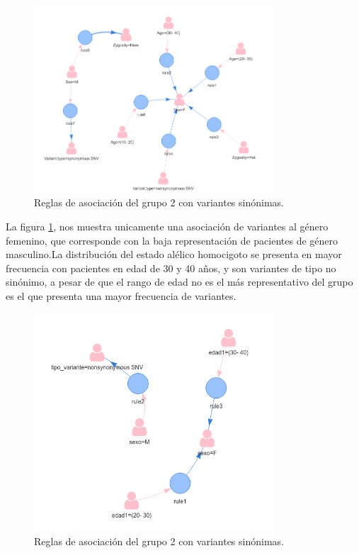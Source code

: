 \begin{figure}[H]
	\centering
	\includegraphics[width=0.8\textwidth]{Kap4/reglas2_1}
	\caption{Reglas de asociación del grupo 2 con variantes sinónimas.} \label{fig:reglas2_1}
\end{figure}

La figura \ref{fig:reglas2_1}, nos muestra unicamente una asociación de variantes al género femenino, que corresponde con la baja representación de pacientes de género  masculino.La distribución del estado alélico homocigoto se presenta en mayor frecuencia con pacientes en edad de 30 y 40 años, y son variantes de tipo no sinónimo, a pesar de que el rango de edad no es el más representativo del grupo es el que presenta una mayor frecuencia de variantes.
 
\begin{figure}[H]
	\centering
	\includegraphics[width=0.8\textwidth]{Kap4/reglas2_2}
	\caption{Reglas de asociación del grupo 2 con variantes sinónimas.} \label{fig:reglas2_2}
\end{figure}

